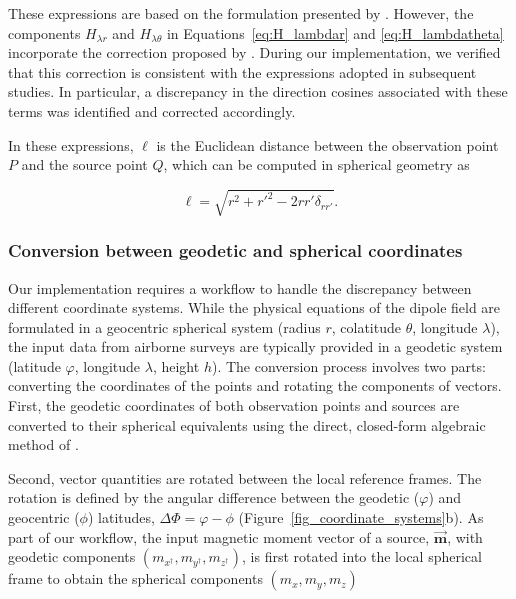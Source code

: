
These expressions are based on the formulation presented by \citet[see Table 5.2]{Langel1998}.
However, the components
$H_{\lambda r}$ and $H_{\lambda \theta}$ in Equations~\ref{eq:H_lambdar} and \ref{eq:H_lambdatheta}
incorporate the correction proposed by \citet{Dyment1998}.
During our implementation, we verified that
this correction is consistent with the expressions adopted in
subsequent studies. In particular, a discrepancy in the direction
cosines associated with these terms was identified and corrected
accordingly.

In these expressions, $\ell$ is the Euclidean distance between the observation point $P$ and the
source point $Q$, which can be computed in spherical geometry as

\begin{equation}
    \ell = \sqrt{r^2 + r'^2 - 2 r r' \delta_{rr'}}.
\end{equation}

\subsubsection{Conversion between geodetic and spherical coordinates}

Our implementation requires a workflow to handle the discrepancy between different coordinate
systems. While the physical equations of the dipole field are formulated in a geocentric spherical
system (radius $r$, colatitude $\theta$, longitude $\lambda$), the input data from airborne surveys
are typically provided in a geodetic system (latitude $\varphi$, longitude $\lambda$, height $h$).
The conversion process involves two parts: converting the coordinates of the points and rotating the
components of vectors. First, the geodetic coordinates of both observation points and sources are
converted to their spherical equivalents using the direct, closed-form algebraic method of \citet{Vermeille2002}.

Second, vector quantities are rotated between the local reference frames. The rotation is defined by
the angular difference between the geodetic ($\varphi$) and geocentric ($\phi$) latitudes,
$\Delta\Phi = \varphi - \phi$ (Figure~\ref{fig_coordinate_systems}b). As part of our workflow, the
input magnetic moment vector of a source, $\vec{\mathbf{m}}$, with geodetic components $(m_{x^{\dagger}}, m_{y^{\dagger}}, m_{z^{\dagger}})$,
is first rotated into the local spherical frame to obtain the spherical components $(m_x, m_y, m_z)$

